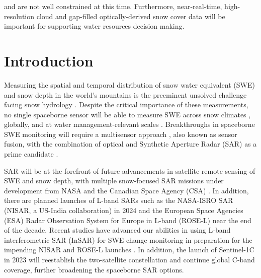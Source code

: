 and are not well constrained at this time. Furthermore, near-real-time, high-resolution cloud and gap-filled optically-derived snow cover data will be important for supporting water resources decision making.

\hypertarget{ch4-intro}{\section{Introduction}\label{ch4-intro}}

Measuring the spatial and temporal distribution of snow water equivalent (SWE) and snow depth in the world’s mountains is the preeminent unsolved challenge facing snow hydrology \citep{dozierEstimatingSpatialDistribution2016}. Despite the critical importance of these measurements, no single spaceborne sensor will be able to measure SWE across snow climates \citep{sturmSeasonalSnowCover1995, sturmRevisitingGlobalSeasonal2021}, globally, and at water management-relevant scales \citep{lettenmaierInroadsRemoteSensing2015}. Breakthroughs in spaceborne SWE monitoring will require a multisensor approach \citep{durandAchievingBreakthroughsGlobal2021}, also known as sensor fusion, with the combination of optical and Synthetic Aperture Radar (SAR) as a prime candidate \citep{tarriconeEstimatingSnowAccumulation2023a,lievensSnowDepthVariability2019, lievensSentinel1SnowDepth2022}. 

SAR will be at the forefront of future advancements in satellite remote sensing of SWE and snow depth, with multiple snow-focused SAR missions under development from NASA and the Canadian Space Agency (CSA) \citep{tsangReviewArticleGlobal2022, yuehSatelliteSyntheticAperture2021, garnaudQuantifyingSnowMass2019}. In addition, there are planned launches of L-band SARs such as the NASA-ISRO SAR (NISAR, a US-India collaboration) in 2024 and the European Space Agencies (ESA) Radar Observation System for Europe in L-band (ROSE-L) near the end of the decade. Recent studies have advanced our abilities in using L-band interferometric SAR (InSAR) for SWE change monitoring in preparation for the impending NISAR and ROSE-L launches \citep{tarriconeEstimatingSnowAccumulation2023a, marshallLBandInSARDepth2021, naglerAirborneExperimentInsar2022}. In addition, the launch of Sentinel-1C in 2023 will reestablish the two-satellite constellation and continue global C-band coverage, further broadening the spaceborne SAR options. 

